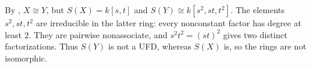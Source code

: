 By , $X\cong Y$, but $S(X)=k[s,t]$ and $S(Y)\cong k[s^2,st,t^2]$. The elements $s^2,st,t^2$ are irreducible in the latter ring: every nonconstant factor has degree at least $2$. They are pairwise nonassociate, and $s^2t^2=(st)^2$ gives two distinct factorizations. Thus $S(Y)$ is not a UFD, whereas $S(X)$ is, so the rings are not isomorphic.
